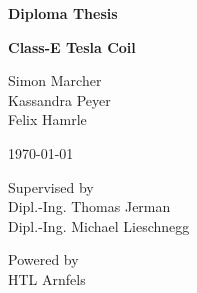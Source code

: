 \documentclass[
	fontsize=10pt, %
	twoside=true, %
	numbers=noenddot, %
]{kaobook}
\begin{document}






\frontmatter %




\begin{titlepage}
    \begin{center}
        \vspace*{1cm}
            
        \Large
        \textbf{Diploma Thesis}
            
        \vspace{0.5cm}
        \Huge
        \textbf{Class-E Tesla Coil}
        
        \vspace{1.5cm}

        \LARGE
        Simon Marcher\\Kassandra Peyer\\Felix Hamrle

        \vspace{1cm}
        \Large
        \today

        \vspace{2cm}

        \large
        Supervised by\\
        \Large
        Dipl.-Ing. Thomas Jerman\\
        Dipl.-Ing. Michael Lieschnegg\\

        \vfill

        \large
        Powered by\\
        \Large
        HTL Arnfels
      \end{center}
\end{titlepage}
\end{document}
